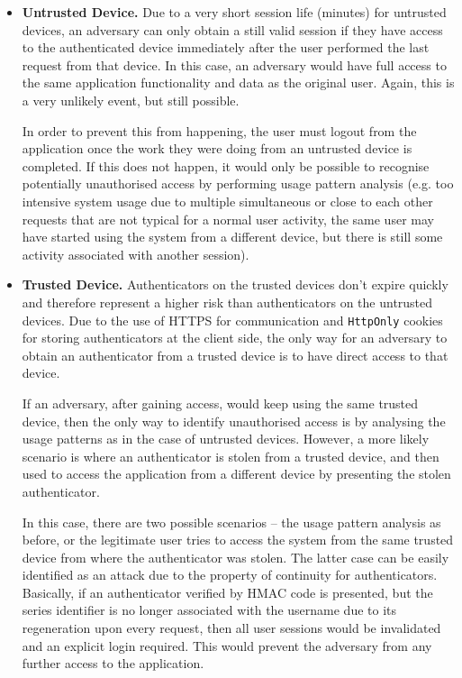 \documentclass[a4paper,12pt,oneside,openright]{memoir}
\begin{document}
	\begin{itemize}
	\item\textbf{Untrusted Device.}
	Due to a very short session life (minutes) for untrusted devices, an adversary can only obtain a still valid session if they have access to the authenticated device immediately after the user performed the last request from that device.
	In this case, an adversary would have full access to the same application functionality and data as the original user.
	Again, this is a very unlikely event, but still possible.

	In order to prevent this from happening, the user must logout from the application once the work they were doing from an untrusted device is completed.
	If this does not happen, it would only be possible to recognise potentially unauthorised access by performing usage pattern analysis (e.g. too intensive system usage due to multiple simultaneous or close to each other requests that are not typical for a normal user activity, the same user may have started using the system from a different device, but there is still some activity associated with another session).

	\item\textbf{Trusted Device.}
	Authenticators on the trusted devices don't expire quickly and therefore represent a higher risk than authenticators on the untrusted devices.
	Due to the use of HTTPS for communication and \texttt{HttpOnly} cookies for storing authenticators at the client side, the only way for an adversary to obtain an authenticator from a trusted device is to have direct access to that device.

	If an adversary, after gaining access, would keep using the same trusted device, then the only way to identify unauthorised access is by analysing the usage patterns as in the case of untrusted devices.
	However, a more likely scenario is where an authenticator is stolen from a trusted device, and then used to access the application from a different device by presenting the stolen authenticator.

	In this case, there are two possible scenarios -- the usage pattern analysis as before, or the legitimate user tries to access the system from the same trusted device from where the authenticator was stolen.
	The latter case can be easily identified as an attack due to the property of continuity for authenticators.
	Basically, if an authenticator verified by HMAC code is presented, but the series identifier is no longer associated with the username due to its regeneration upon every request, then all user sessions would be invalidated and an explicit login required.
	This would prevent the adversary from any further access to the application.
	\end{itemize}
\end{document}
